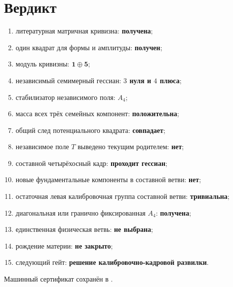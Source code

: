 \section{Вердикт}

\begin{protocol}
\begin{enumerate}
 \item литературная матричная кривизна: \textbf{получена};
 \item один квадрат для формы и амплитуды: \textbf{получен};
 \item модуль кривизны: \textbf{$\mathbf1\oplus\mathbf5$};
 \item независимый семимерный гессиан: \textbf{$3$ нуля и $4$ плюса};
 \item стабилизатор независимого поля: \textbf{$A_4$};
 \item масса всех трёх семейных компонент: \textbf{положительна};
 \item общий след потенциального квадрата: \textbf{совпадает};
 \item независимое поле $T$ выведено текущим родителем: \textbf{нет};
 \item составной четырёхосный кадр: \textbf{проходит гессиан};
 \item новые фундаментальные компоненты в составной ветви: \textbf{нет};
 \item остаточная левая калибровочная группа составной ветви:
 \textbf{тривиальна};
 \item диагональная или гранично фиксированная $A_4$:
 \textbf{получена};
 \item единственная физическая ветвь: \textbf{не выбрана};
 \item рождение материи: \textbf{не закрыто};
 \item следующий гейт: \textbf{решение калибровочно-кадровой развилки}.
\end{enumerate}
\end{protocol}

Машинный сертификат сохранён в
.
